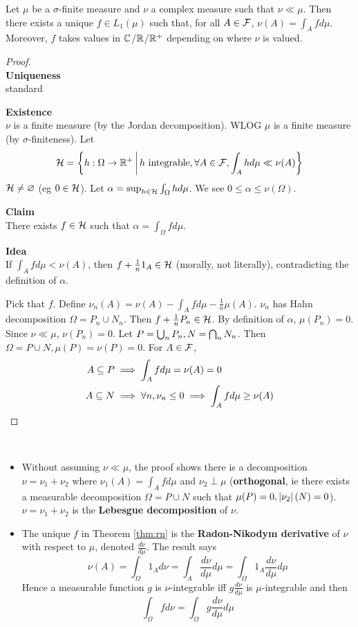 \documentclass{article}
\begin{document}
\begin{thm}\label{thm:rn}
  Let $\mu$ be a $\sigma$-finite measure and $\nu$ a complex measure such that $\nu \ll \mu$. Then there exists a unique $f \in L_1(\mu)$ such that, for all $A \in \mathcal F$, $\nu(A) = \int_A f d\mu$. Moreover, $f$ takes values in $\mathbb C$/$\mathbb R$/$\mathbb R^+$ depending on where $\nu$ is valued.
\end{thm}
\begin{proof}~\\
  {\bf Uniqueness} \\
  standard

  {\bf Existence} \\
  $\nu$ is a finite measure (by the Jordan decomposition). WLOG $\mu$ is a finite measure (by $\sigma$-finiteness). Let
  $$\mathcal H = \left\{ h : \Omega \to \mathbb R^+ \,\middle|\, h \text{ integrable}, \forall A \in \mathcal F, \int_A h d\mu \ll \nu(A)\right\}$$
  $\mathcal H \ne \varnothing$ (eg $0 \in \mathcal H$). Let $\alpha = \sup_{h \in \mathcal H} \int_\Omega h d\mu$. We see $0 \le \alpha \le \nu(\Omega)$.

  {\bf Claim} \\
  There exists $f \in \mathcal H$ such that $\alpha = \int_\Omega f d\mu$.

  {\bf Idea} \\
  If $\int_A fd\mu < \nu(A)$, then $f + \frac 1 n 1_A \in \mathcal H$ (morally, not literally), contradicting the definition of $\alpha$.

  Pick that $f$. Define $\nu_n(A) = \nu(A) - \int_A fd\mu - \frac 1n \mu(A)$. $\nu_n$ has Hahn decomposition $\Omega = P_n \cup N_n$. Then $f + \frac 1n P_n \in \mathcal H$. By definition of $\alpha$, $\mu(P_n) = 0$. Since $\nu \ll \mu$, $\nu(P_n) = 0$. Let $P = \bigcup_n P_n, N = \bigcap_n N_n$. Then $\Omega = P \cup N, \mu(P) = \nu(P) = 0$. For $A \in \mathcal F$,
  \begin{align*}
    A \subseteq P & \implies \int_A fd\mu = \nu(A) = 0 \\
    A \subseteq N & \implies \forall n, \nu_n \le 0 \implies \int_A fd\mu \ge \nu(A)
  \end{align*}
\end{proof}

\begin{rmks}~
  \begin{itemize}
    \item Without assuming $\nu \ll \mu$, the proof shows there is a decomposition $\nu = \nu_1 + \nu_2$ where $\nu_1(A) = \int_A fd\mu$ and $\nu_2 \perp \mu$ ({\bf orthogonal}, ie there exists a measurable decomposition $\Omega = P \cup N$ such that $\mu(P) = 0, \left\lvert \nu_2\right\rvert(N) = 0$). $\nu = \nu_1 + \nu_2$ is the {\bf Lebesgue decomposition} of $\nu$.
    \item The unique $f$ in Theorem \ref{thm:rn} is the {\bf Radon-Nikodym derivative} of $\nu$ with respect to $\mu$, denoted $\frac{d\nu}{d\mu}$. The result says
    $$\nu(A) = \int_\Omega 1_A d\nu = \int_A \frac{d\nu}{d\mu} d\mu = \int_\Omega 1_A \frac{d\nu}{d\mu} d\mu$$
    Hence a measurable function $g$ is $\nu$-integrable iff $g\frac{d\nu}{d\mu}$ is $\mu$-integrable and then
    $$\int_\Omega f d\nu = \int_\Omega g \frac{d\nu}{d\mu} d\mu$$
  \end{itemize}
\end{rmks}
\end{document}
